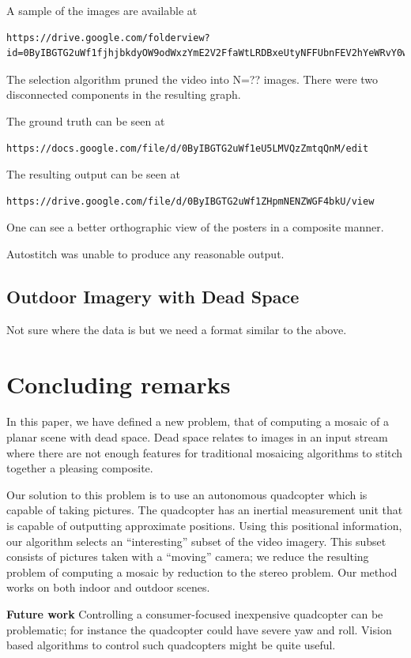 \documentclass[10pt,twocolumn,letterpaper]{article}
\begin{document}
A sample of the images are available at

\begin{verbatim}
https://drive.google.com/folderview?id=0ByIBGTG2uWf1fjhjbkdyOW9odWxzYmE2V2FfaWtLRDBxeUtyNFFUbnFEV2hYeWRvY0w1enc&usp=sharing
\end{verbatim}

The selection algorithm pruned the video into N=?? images.
There were two  disconnected components in the resulting graph.  

The ground truth can be seen at

\begin{verbatim}
https://docs.google.com/file/d/0ByIBGTG2uWf1eU5LMVQzZmtqQnM/edit
\end{verbatim}

The resulting output can be seen at 

\begin{verbatim}
https://drive.google.com/file/d/0ByIBGTG2uWf1ZHpmNENZWGF4bkU/view
\end{verbatim}

One can see a better orthographic view of the posters in a composite
manner. 

Autostitch was unable to produce any reasonable output.


\subsection{Outdoor Imagery with Dead Space}

{\color{red} Not sure where the data is but we need a format similar
  to the above.}

\section{Concluding remarks}

In this paper, we have defined a new problem, that of computing a
mosaic of a planar scene with dead space.  Dead space relates to images
in an input stream where there are not enough features for traditional
mosaicing algorithms to stitch together a pleasing composite.  

Our solution to this problem is to use an autonomous quadcopter which
is capable of taking pictures.  The quadcopter has an inertial
measurement unit that is capable of outputting approximate
positions. Using this positional information, our algorithm selects an
``interesting'' subset of the video imagery.  This subset consists of
pictures taken with a ``moving'' camera; we reduce the resulting
problem of computing a mosaic by reduction to the stereo problem.  Our
method works on both indoor and outdoor scenes.

{\bf Future work} Controlling a consumer-focused inexpensive
quadcopter can be problematic; for instance the quadcopter could have
severe yaw and roll.  Vision based algorithms to control such
quadcopters might be quite useful.
\end{document}
